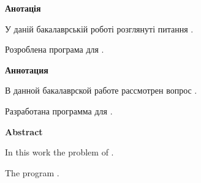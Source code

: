 \documentclass[ukrainian,utf8,pointsubsection,simple]{eskdtext}
\newcommand{\abstracttile}[1]{%
\begingroup%
\centering\fontsize{18pt}{20pt}\selectfont\textbf{#1}\par%
\endgroup}
\begin{document}
\thispagestyle{empty}
\linespread{1.05}\selectfont
\abstracttile{Анотація}
У даній бакалаврській роботі розглянуті питання \TBD.

Розроблена програма для \TBD.

\abstracttile{Аннотация}
В данной бакалаврской работе рассмотрен вопрос \TBD.

Разработана программа для \TBD.

\abstracttile{Abstract}
In this work the problem of \TBD.

The program \TBD.
\end{document}
